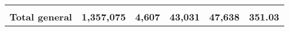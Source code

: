 \begin{tabular}{lrcclr}
	& \multicolumn{1}{l}{}                                           & \multicolumn{1}{l}{}                                       & \multicolumn{1}{l}{} &                                                                     & \multicolumn{1}{l}{}                                                         \\
	\rowcolor[HTML]{DDEBF7} 
	\textbf{Total   general}                                       & \textbf{1,357,075}                                             & \multicolumn{1}{r}{\cellcolor[HTML]{DDEBF7}\textbf{4,607}} & \textbf{43,031}      & \textbf{47,638}                                                     & \textbf{351.03}                                                             
\end{tabular}